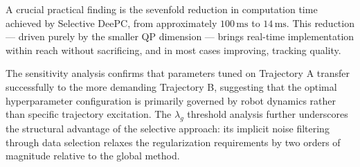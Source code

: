 A crucial practical finding is the sevenfold reduction in computation time achieved by Selective DeePC, from approximately $100\,\mathrm{ms}$ to $14\,\mathrm{ms}$. This reduction — driven purely by the smaller QP dimension — brings real-time implementation within reach without sacrificing, and in most cases improving, tracking quality.

The sensitivity analysis confirms that parameters tuned on Trajectory A transfer successfully to the more demanding Trajectory B, suggesting that the optimal hyperparameter configuration is primarily governed by robot dynamics rather than specific trajectory excitation. The $\lambda_g$ threshold analysis further underscores the structural advantage of the selective approach: its implicit noise filtering through data selection relaxes the regularization requirements by two orders of magnitude relative to the global method.